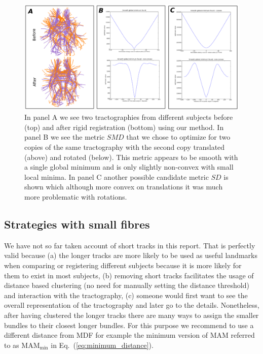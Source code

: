 \documentclass[preprint,authoryear,a4paper,10pt,onecolumn]{elsarticle}
\begin{document}
%
\begin{figure}
\begin{centering}
\includegraphics[scale=0.8]{last_figures/LSC_registration2}
\par\end{centering}
\caption{In panel A we see two tractographies from different subjects
  before (top) and after rigid registration (bottom) using our
  method. In panel B we see the metric $SMD$ that we chose to optimize
  for two copies of the same tractography with the second copy
  translated (above) and rotated (below). This metric appears to be
  smooth with a single global minimum and is only slightly non-convex
  with small local minima. In panel C another possible candidate metric
  $SD$ is shown which although more convex on translations it was much
  more problematic with rotations.\label{Flo:direct_registration}}
\end{figure}

\subsection{Strategies with small fibres}

We have not so far taken account of short tracks in this report. That
is perfectly valid because (a) the longer tracks are more likely to
be used as useful landmarks when comparing or registering different
subjects because it is more likely for them to exist in most subjects,
(b) removing short tracks facilitates the usage of distance based
clustering (no need for manually setting the distance threshold) and
interaction with the tractography, (c) someone would first want to
see the overall representation of the tractography and later go to
the details. Nonetheless, after having clustered the longer tracks
there are many ways to assign the smaller bundles to their closest
longer bundles. For this purpose we recommend to use a different distance
from MDF for example the minimum version of MAM referred
to as $\textrm{MAM}_{\textrm{min}}$ in Eq.~(\ref{eq:minimum_distance}). 
\end{document}
